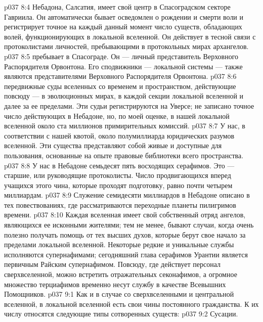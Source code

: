 \vs p037 8:4  Небадона, Салсатия, имеет свой центр в Спасоградском секторе Гавриила. Он автоматически бывает осведомлен о рождении и смерти воли и регистрирует точное на каждый данный момент число существ, обладающих волей, функционирующих в локальной вселенной. Он действует в тесной связи с протоколистами личностей, пребывающими в протокольных мирах архангелов.
\vs p037 8:5  пребывает в Спасограде. Он --- личный представитель Верховного Распорядителя Орвонтона. Его сподвижники ---  локальной системы --- также являются представителями Верховного Распорядителя Орвонтона.
\vs p037 8:6  передвижные суды вселенных со временем и пространством, действующие повсюду --- в эволюционных мирах, в каждой секции локальной вселенной и далее за ее пределами. Эти судьи регистрируются на Уверсе; не записано точное число действующих в Небадоне, но, по моей оценке, в нашей локальной вселенной около ста миллионов примирительных комиссий.
\vs p037 8:7 У нас, в соответствии с нашей квотой, около полумиллиарда  юридических разумов вселенной. Эти существа представляют собой живые и доступные для пользования, основанные на опыте правовые библиотеки всего пространства.
\vs p037 8:8 У нас в Небадоне семьдесят пять  восходящих серафимов. Это --- старшие, или руководящие протоколисты. Число продвигающихся вперед учащихся этого чина, которые проходят подготовку, равно почти четырем миллиардам.
\vs p037 8:9 Служение семидесяти миллиардов  в Небадоне описано в тех повествованиях, где рассматриваются переходные планеты пилигримов времени.
\vs p037 8:10 \pc Каждая вселенная имеет свой собственный отряд ангелов, являющихся ее исконными жителями; тем не менее, бывают случаи, когда очень полезно получать помощь от тех высших духов, которые берут свое начало за пределами локальной вселенной. Некоторые редкие и уникальные службы исполняются супернафимами; сегодняшний глава серафимов Урантии является первичным Райским супернафимом. Повсюду, где действует персонал сверхвселенной, можно встретить отражательных секонафимов, а огромное множество терциафимов временно несут службу в качестве Всевышних Помощников.
\vs p037 9:1 Как и в случае со сверхвселенными и центральной вселенной, в локальной вселенной есть свои чины постоянного гражданства. К их числу относятся следующие типы сотворенных существ:
\vs p037 9:2 \bibnobreakspace Сусации.
